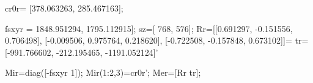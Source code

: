    cr0r= [378.063263,  285.467163];

  fsxyr = 1848.951294,  1795.112915];
sz=[ 768, 576];
Rr=[[0.691297, -0.151556, 0.706498],
 [-0.009506, 0.975764, 0.218620],
 [-0.722508, -0.157848, 0.673102]]=
tr=[-991.766602, -212.195465, -1191.052124]'

Mir=diag([-fsxyr 1]); Mir(1:2,3)=cr0r';
Mer=[Rr tr];
